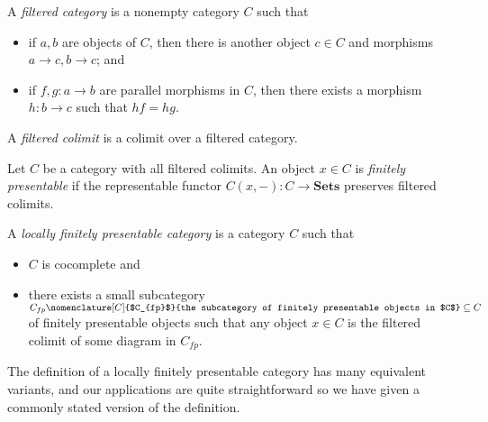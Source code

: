 \documentclass{amsbook} %
\newcommand{\mb}{\mathbf}
\numberwithin{section}{chapter}
\begin{document}
\begin{Defi}\label{def:filtered}
A \textit{filtered category} is a nonempty category $C$ such that
\begin{itemize}
\item if $a,b$ are objects of $C$, then there is another object $c \in C$ and morphisms $a \to c, b \to c$; and
\item if $f,g \colon a \to b$ are parallel morphisms in $C$, then there exists a morphism $h \colon b \to c$ such that $hf = hg$.
\end{itemize}
\end{Defi}

\begin{Defi}
A \emph{filtered colimit} is a colimit over a filtered category.
\end{Defi}

\begin{Defi}
Let $C$ be a category with all filtered colimits.  An object $x \in C$ is \textit{finitely presentable} if the representable functor $C(x, -) \colon C \rightarrow \mb{Sets}$ preserves filtered colimits.
\end{Defi}

\begin{Defi}
A \textit{locally finitely presentable category} is a category $C$ such that
\begin{itemize}
\item $C$ is cocomplete and
\item there exists a small subcategory $C_{fp}\nomenclature[C]{$C_{fp}$}{the subcategory of finitely presentable objects in $C$} \subseteq C$ of finitely presentable objects such that any object $x \in C$ is the filtered colimit of some diagram in $C_{fp}$.
\end{itemize}
\end{Defi}

The definition of a locally finitely presentable category has many equivalent variants, and our applications are quite straightforward so we have given a commonly stated version of the definition.
\end{document}
